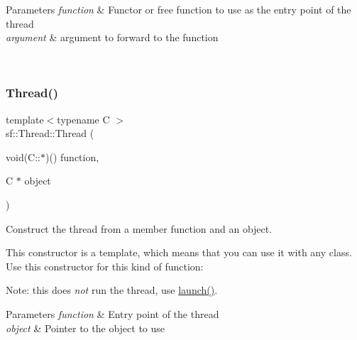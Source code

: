 \begin{DoxyParams}{Parameters}
{\em function} & Functor or free function to use as the entry point of the thread \\
\hline
{\em argument} & argument to forward to the function \begin{DoxyVerb}\end{DoxyVerb}
 \\
\hline
\end{DoxyParams}
\mbox{\label{classsf_1_1_thread_aa9f473c8cbb078900c62b1fd14a83a34}} 
\subsubsection{\texorpdfstring{Thread()}{Thread()}\hspace{0.1cm}{\footnotesize\ttfamily [3/3]}}
{\footnotesize\ttfamily template$<$typename C $>$ \\
sf\+::\+Thread\+::\+Thread (\begin{DoxyParamCaption}\item[{void(C\+::$\ast$)()}]{function,  }\item[{C $\ast$}]{object }\end{DoxyParamCaption})}



Construct the thread from a member function and an object. 

This constructor is a template, which means that you can use it with any class. Use this constructor for this kind of function\+: 
\begin{DoxyCode}{0}
\DoxyCodeLine{\{}
\DoxyCodeLine{\textcolor{keyword}{public}:}
\DoxyCodeLine{}
\DoxyCodeLine{    \textcolor{keywordtype}{void} \textcolor{keyword}{function}();}
\DoxyCodeLine{\};}
\end{DoxyCode}
 Note\+: this does {\itshape not} run the thread, use \mbox{\hyperlink{classsf_1_1_thread_a74f75a9e86e1eb47479496314048b5f6}{launch()}}.


\begin{DoxyParams}{Parameters}
{\em function} & Entry point of the thread \\
\hline
{\em object} & Pointer to the object to use \begin{DoxyVerb}\end{DoxyVerb}
 \\
\hline
\end{DoxyParams}
\mbox{\label{classsf_1_1_thread_af77942fc1730af7c31bc4c3a913a9c1d}} 

